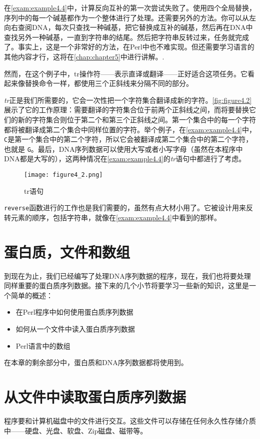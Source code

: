 在\autoref{exam:example4.4}中，计算反向互补的第一次尝试失败了。使用四个全局替换，序列中的每一个碱基都作为一个整体进行了处理。还需要另外的方法。你可以从左向右查阅DNA，每次只查找一种碱基，把它替换成互补的碱基，然后再在DNA中查找另外一种碱基，一直到字符串的结尾。然后把字符串反转过来，任务就完成了。事实上，这是一个非常好的方法，在Perl中也不难实现。但还需要学习语言的其他内容才行，这将在\autoref{chap:chapter5}中进行讲解。.

然而，在这个例子中，tr操作符——表示直译或翻译——正好适合这项任务。它看起来像替换命令一样，都使用三个正斜线来分隔不同的部分。

\textit{tr}正是我们所需要的，它会一次性把一个字符集合翻译成新的字符。\autoref{fig:figure4.2}展示了它的工作原理：需要翻译的字符集合位于前两个正斜线之间，而将要替换它们的新的字符集合则位于第二个和第三个正斜线之间。第一个集合中的每一个字符都将被翻译成第二个集合中同样位置的字符。举个例子，在\autoref{exam:example4.4}中， \verb|C|是第一个集合中的第二个字符，所以它会被翻译成第二个集合中的第二个字符，也就是 \verb|G|。最后，DNA序列数据可以使用大写或者小写字母（虽然在本程序中DNA都是大写的），这两种情况在\autoref{exam:example4.4}的\textit{tr}语句中都进行了考虑。

\begin{figure}
  \centering
  \texttt{[image: figure4\_2.png]}
  \caption{tr语句}
  \label{fig:figure4.2}
\end{figure}

 \verb|reverse|函数进行的工作也是我们需要的，虽然有点大材小用了。它被设计用来反转元素的顺序，包括字符串，就像在\autoref{exam:example4.4}中看到的那样。

\section{蛋白质，文件和数组}
到现在为止，我们已经编写了处理DNA序列数据的程序，现在，我们也将要处理同样重要的蛋白质序列数据。接下来的几个小节将要学习一些新的知识，这里是一个简单的概述：

\begin{itemize}
  \item 在Perl程序中如何使用蛋白质序列数据
  \item 如何从一个文件中读入蛋白质序列数据
  \item Perl语言中的数组
\end{itemize}

在本章的剩余部分中，蛋白质和DNA序列数据都将使用到。

\section{从文件中读取蛋白质序列数据}
程序要和计算机磁盘中的文件进行交互。这些文件可以存储在任何永久性存储介质中——硬盘、光盘、软盘、Zip磁盘、磁带等。

